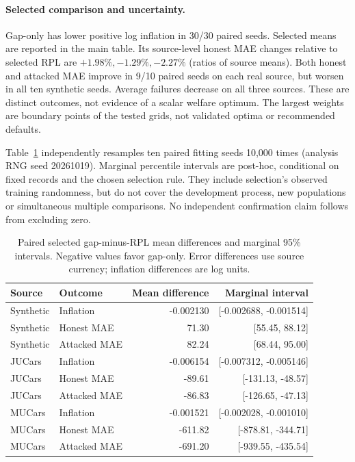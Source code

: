 \paragraph{Selected comparison and uncertainty.}
Gap-only has lower positive log inflation in 30/30 paired seeds.
Selected means are reported in the main table. Its source-level honest
MAE changes relative to selected RPL are $+1.98\%,-1.29\%,-2.27\%$
(ratios of source means). Both honest and attacked MAE improve in 9/10
paired seeds on each real source, but worsen in all ten synthetic seeds.
Average failures decrease on all three sources. These are distinct outcomes,
not evidence of a scalar welfare optimum. The largest weights are boundary
points of the tested grids, not validated optima or recommended defaults.

Table~\ref{tab:gap_paired} independently resamples ten paired fitting seeds
10,000 times (analysis RNG seed 20261019). Marginal percentile intervals are
post-hoc, conditional on fixed records and the chosen selection rule. They
include selection's observed training randomness, but do not cover the
development process, new populations or simultaneous multiple comparisons.
No independent confirmation claim follows from excluding zero.
\begin{table}[htbp]\centering\small
\caption{Paired selected gap-minus-RPL mean differences and marginal 95\%
intervals. Negative values favor gap-only. Error differences use source
currency; inflation differences are log units.}
\label{tab:gap_paired}
\begin{tabular}{llrr}\toprule
Source & Outcome & Mean difference & Marginal interval\\\midrule
Synthetic & Inflation & -0.002130 & [-0.002688, -0.001514]\\
Synthetic & Honest MAE & 71.30 & [55.45, 88.12]\\
Synthetic & Attacked MAE & 82.24 & [68.44, 95.00]\\
\midrule
JUCars & Inflation & -0.006154 & [-0.007312, -0.005146]\\
JUCars & Honest MAE & -89.61 & [-131.13, -48.57]\\
JUCars & Attacked MAE & -86.83 & [-126.65, -47.13]\\
\midrule
MUCars & Inflation & -0.001521 & [-0.002028, -0.001010]\\
MUCars & Honest MAE & -611.82 & [-878.81, -344.71]\\
MUCars & Attacked MAE & -691.20 & [-939.55, -435.54]\\
\bottomrule\end{tabular}\end{table}
